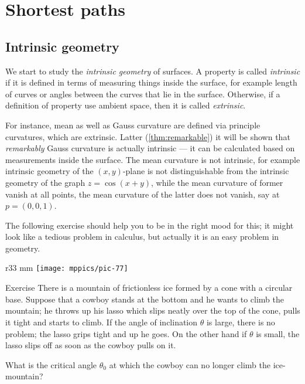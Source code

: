 \chapter{Shortest paths}

\section{Intrinsic geometry}

We start to study the \emph{intrinsic geometry} of surfaces.
A property is called \emph{intrinsic} if it is defined in terms of measuring things inside the surface, for example length of curves or angles between the curves that lie in the surface.
Otherwise, if a definition of property use ambient space, then it is called \emph{extrinsic}.

For instance, mean as well as Gauss curvature are defined via principle curvatures, which are extrinsic.
Latter (\ref{thm:remarkable}) it will be shown that \emph{remarkably} Gauss curvature is actually intrinsic --- it can be calculated based on measurements inside the surface.
The mean curvature is not intrinsic, for example intrinsic geometry of the $(x,y)$-plane is not distinguishable from the intrinsic geometry of the graph $z=\cos(x+y)$,
while the mean curvature of former vanish at all points, the mean curvature of the latter does not vanish, say at $p=(0,0,1)$.  

The following exercise should help you to be in the right mood for this;
it might look like a tedious problem in calculus, but actually it is an easy problem in geometry.

\begin{wrapfigure}{r}{33 mm}
\vskip-0mm
\centering
\texttt{[image: mppics/pic-77]}
\vskip-0mm
\end{wrapfigure}

\begin{thm}{Exercise}\label{ex:lasso}
There is a mountain of frictionless ice formed by a cone with a circular base.
Suppose that a cowboy stands at the bottom and he wants to climb the mountain;
he throws up his lasso which slips neatly over the top of the cone, pulls it tight and starts to climb.
If the angle of inclination $\theta$ is large, there is no problem; the lasso grips tight and up he goes.
On the other hand if $\theta$ is small, the lasso slips off as soon as the cowboy pulls on it.

What is the critical angle $\theta_0$ at which the cowboy can no longer climb the ice-mountain?
\end{thm}

